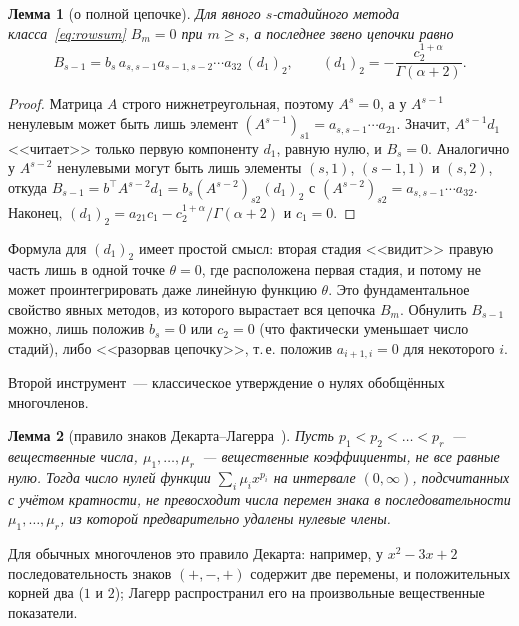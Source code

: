 \documentclass[11pt,a4paper]{article}
\theoremstyle{plain}
\newtheorem{lemma}{Лемма}
\theoremstyle{definition}
\newcommand{\G}{\Gamma}
\begin{document}
\begin{lemma}[о полной цепочке]\label{lem:chain}
Для явного $s$-стадийного метода класса~\eqref{eq:rowsum} $B_m=0$ при $m\ge s$, а последнее звено цепочки равно
\[
B_{s-1}=b_s\,a_{s,s-1}a_{s-1,s-2}\cdots a_{32}\,(d_1)_2,\qquad (d_1)_2=-\frac{c_2^{1+\alpha}}{\G(\alpha+2)} .
\]
\end{lemma}
\begin{proof}
Матрица $A$ строго нижнетреугольная, поэтому $A^s=0$, а у $A^{s-1}$ ненулевым может быть лишь элемент $(A^{s-1})_{s1}=a_{s,s-1}\cdots a_{21}$. Значит, $A^{s-1}d_1$ <<читает>> только первую компоненту $d_1$, равную нулю, и $B_s=0$. Аналогично у $A^{s-2}$ ненулевыми могут быть лишь элементы $(s,1)$, $(s-1,1)$ и $(s,2)$, откуда $B_{s-1}=b^{\top}A^{s-2}d_1=b_s(A^{s-2})_{s2}(d_1)_2$ с $(A^{s-2})_{s2}=a_{s,s-1}\cdots a_{32}$. Наконец, $(d_1)_2=a_{21}c_1-c_2^{1+\alpha}/\G(\alpha+2)$ и $c_1=0$.
\end{proof}

Формула для $(d_1)_2$ имеет простой смысл: вторая стадия <<видит>> правую часть лишь в одной точке $\theta=0$, где расположена первая стадия, и потому не может проинтегрировать даже линейную функцию $\theta$. Это фундаментальное свойство явных методов, из которого вырастает вся цепочка $B_m$. Обнулить $B_{s-1}$ можно, лишь положив $b_s=0$ или $c_2=0$ (что фактически уменьшает число стадий), либо <<разорвав цепочку>>, т.\,е. положив $a_{i+1,i}=0$ для некоторого $i$.

Второй инструмент~--- классическое утверждение о нулях обобщённых многочленов.

\begin{lemma}[правило знаков Декарта--Лагерра~\cite{PolyaSzego}]\label{lem:descartes}
Пусть $p_1<p_2<\dots<p_r$~--- вещественные числа, $\mu_1,\dots,\mu_r$~--- вещественные коэффициенты, не все равные нулю. Тогда число нулей функции $\sum_{i}\mu_ix^{p_i}$ на интервале $(0,\infty)$, подсчитанных с учётом кратности, не превосходит числа перемен знака в последовательности $\mu_1,\dots,\mu_r$, из которой предварительно удалены нулевые члены.
\end{lemma}

Для обычных многочленов это правило Декарта: например, у $x^2-3x+2$ последовательность знаков $(+,-,+)$ содержит две перемены, и положительных корней два ($1$ и $2$); Лагерр распространил его на произвольные вещественные показатели.
\end{document}
